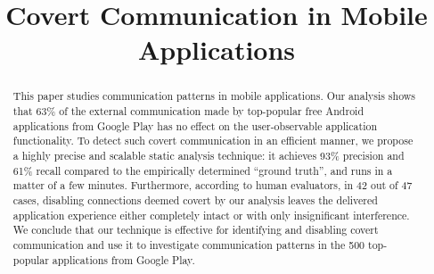 \documentclass[conference]{IEEEtran}
\begin{document}

\title{Covert Communication in Mobile Applications}

\author{
}



\maketitle
\begin{abstract}
This paper studies communication patterns in mobile applications. Our analysis
shows that 63\% of the external communication made by top-popular free
Android applications from Google Play has no effect on the user-observable
application functionality. To detect such covert communication in an efficient
manner, we propose a highly precise and scalable static analysis technique: 
it achieves 93\% precision and 61\% recall compared to the empirically determined ``ground truth'', 
and runs in a matter of a few minutes.
Furthermore, according to human evaluators, in 42 out of 47 cases, disabling connections deemed covert by our analysis leaves the delivered application experience either completely intact or with only insignificant interference. 
We conclude that our technique is effective for identifying and disabling covert communication and use it to investigate communication patterns in the 500 top-popular applications from Google Play. 
\end{abstract}
\end{document}
